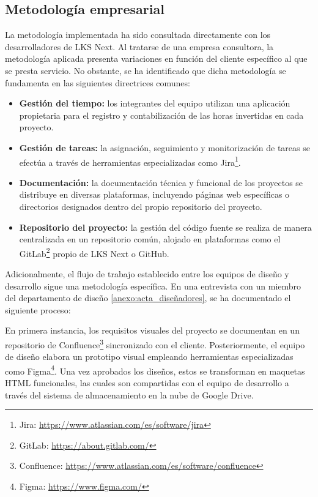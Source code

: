 \subsection{Metodología empresarial}
La metodología implementada ha sido consultada directamente con los desarrolladores de LKS Next. Al tratarse de una empresa consultora, la metodología aplicada presenta variaciones en función del cliente específico al que se presta servicio. No obstante, se ha identificado que dicha metodología se fundamenta en las siguientes directrices comunes:
\begin{itemize}
\item\textbf{Gestión del tiempo: }los integrantes del equipo utilizan una aplicación propietaria para el registro y contabilización de las horas invertidas en cada proyecto.
\item\textbf{Gestión de tareas: }la asignación, seguimiento y monitorización de tareas se efectúa a través de herramientas especializadas como Jira\footnote{Jira: \url{https://www.atlassian.com/es/software/jira}}.
\item\textbf{Documentación: }la documentación técnica y funcional de los proyectos se distribuye en diversas plataformas, incluyendo páginas web específicas o directorios designados dentro del propio repositorio del proyecto.
\item\textbf{Repositorio del proyecto: }la gestión del código fuente se realiza de manera centralizada en un repositorio común, alojado en plataformas como el GitLab\footnote{GitLab: \url{https://about.gitlab.com/}} propio de LKS Next o GitHub.

\end{itemize}
Adicionalmente, el flujo de trabajo establecido entre los equipos de diseño y desarrollo sigue una metodología específica. En una entrevista con un miembro del departamento de diseño \ref{anexo:acta_diseñadores}, se ha documentado el siguiente proceso:

En primera instancia, los requisitos visuales del proyecto se documentan en un repositorio de Confluence\footnote{Confluence: \url{https://www.atlassian.com/es/software/confluence}} sincronizado con el cliente. Posteriormente, el equipo de diseño elabora un prototipo visual empleando herramientas especializadas como Figma\footnote{Figma: \url{https://www.figma.com/}}. Una vez aprobados los diseños, estos se transforman en maquetas HTML funcionales, las cuales son compartidas con el equipo de desarrollo a través del sistema de almacenamiento en la nube de Google Drive.


